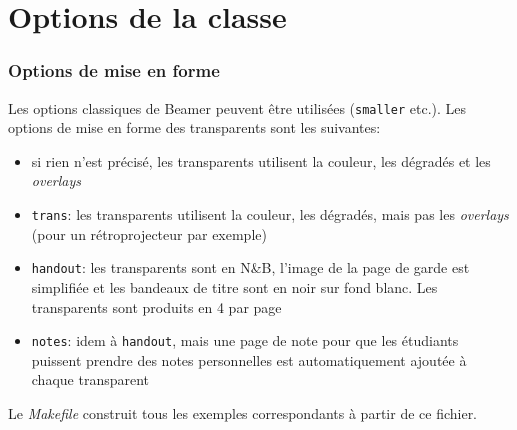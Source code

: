 \documentclass[fr,biblatex]{isae-slides}
\begin{document}
\section{Options de la classe}
\label{sec:class}

\begin{frame}
\frametitle{Options de mise en forme}

\vfill

Les options classiques de Beamer peuvent être utilisées
(\texttt{smaller} etc.). Les options de mise en forme des transparents
sont les suivantes:

\begin{itemize}
\item si rien n'est précisé, les transparents
  utilisent la couleur, les dégradés et les \textit{overlays}
\item \lstinline!trans!: les transparents utilisent la couleur, les
  dégradés, mais pas les \textit{overlays} (pour un rétroprojecteur
  par exemple)
\item \lstinline!handout!: les transparents sont en N\&B, l'image de
  la page de garde est simplifiée et les bandeaux de titre sont en
  noir sur fond blanc. Les transparents sont produits en 4 par page
\item \lstinline!notes!: idem à \lstinline!handout!, mais une page de
  note pour que les étudiants puissent prendre des notes personnelles
  est automatiquement ajoutée à chaque transparent
\end{itemize}

Le \textit{Makefile} construit tous les exemples correspondants à
partir de ce fichier.

\vfill

\end{frame}
\end{document}
